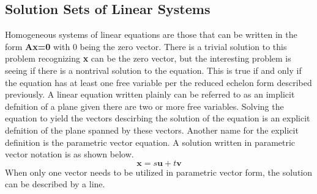 \documentclass[12pt]{article}
\begin{document}
\subsection{Solution Sets of Linear Systems}
Homogeneous systems of linear equations are those that can be written in the form \textbf{Ax=0} with 0 being the zero vector. There is a trivial solution to this problem %
recognizing \textbf{x} can be the zero vector, but the interesting problem is seeing if there is a nontrival solution to the equation. This is true if and only if %
the equation has at least one free variable per the reduced echelon form described previously. 
\newline
\newline
A linear equation written plainly can be referred to as an implicit defnition of a plane given there are two or more free variables. Solving the equation to yield the vectors %
descirbing the solution of the equation is an explicit defnition of the plane spanned by these vectors. Another name for the explicit definition is the parametric vector%
 equation. A solution written in parametric vector notation is as shown below.
\begin{equation}
     \mathbf{x} = s\mathbf{u}+t\mathbf{v}
\end{equation}
When only one vector needs to be utilized in parametric vector form, the solution can be described by a line. 
\newline
\newline
\end{document}
